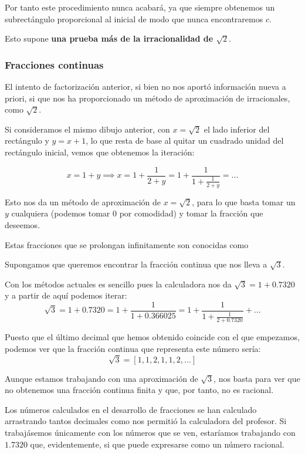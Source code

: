 \documentclass{apuntes}
\begin{document}
Por tanto este procedimiento nunca acabará, ya que siempre obtenemos un subrectángulo proporcional al inicial de modo que nunca encontraremos $c$.

Esto supone \textbf{una prueba más de la irracionalidad de $\sqrt{2}$}.

\subsubsection{Fracciones continuas}
El intento de factorización anterior, si bien no nos aportó información nueva a priori, si que nos ha proporcionado un método de aproximación de irracionales, como $\sqrt{2}$.

Si consideramos el mismo dibujo anterior, con $x = \sqrt{2}$ el lado inferior del rectángulo y $y=x+1$, lo que resta de base al quitar un cuadrado unidad del rectángulo inicial, vemos que obtenemos la iteración:

\[x = 1+y \implies x = 1 + \frac{1}{2+y} = 1 + \frac{1}{1 + \frac{1}{2+y}} = ... \]

Esto nos da un método de aproximación de $x=\sqrt{2}$, para lo que basta tomar un $y$ cualquiera (podemos tomar 0 por comodidad) y tomar la fracción que deseemos. 

Estas fracciones que se prolongan infinitamente son conocidas como 

\begin{example}
Supongamos que queremos encontrar la fracción continua que nos lleva a $\sqrt{3}$.

Con los métodos actuales es sencillo pues la calculadora nos da $\sqrt{3} = 1 +0.7320$ y a partir de aquí podemos iterar:
\[\sqrt{3}=1+0.7320 = 1 +\frac{1}{1 + 0.366025} = 1 + \frac{1}{1+ \frac{1}{2+0.7320}}+ ...\]

Puesto que el último decimal que hemos obtenido coincide con el que empezamos, podemos ver que la fracción continua que representa este número sería:
\[\sqrt{3} = [1,1,2,1,1,2,...]\]

Aunque estamos trabajando con una aproximación de $\sqrt{3}$, nos basta para ver que no obtenemos una fracción continua finita y que, por tanto, no es racional.

\obs Los números calculados en el desarrollo de fracciones se han calculado arrastrando tantos decimales como nos permitió la calculadora del profesor. Si trabajásemos únicamente con los números que se ven, estaríamos trabajando con $1.7320$ que, evidentemente, si que puede expresarse como un número racional.
\end{example}
\end{document}
